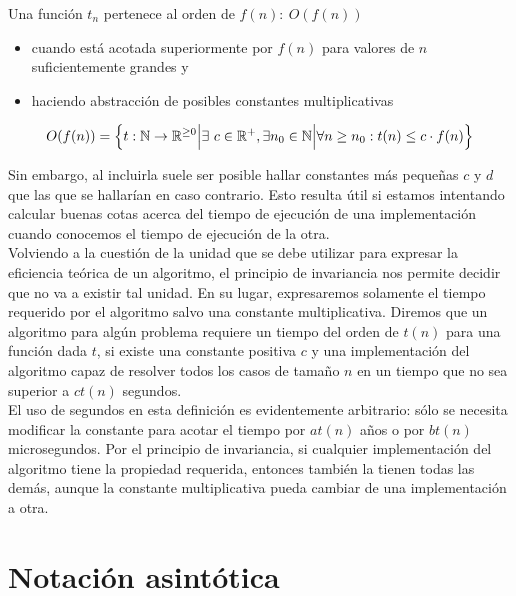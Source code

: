 \begin{fondo}
Una función $t_n$ pertenece al orden de $f(n):\ O(f(n))$
\begin{itemize}
\item cuando está acotada superiormente por $f(n)$ para valores de $n$ suficientemente grandes y
\item haciendo abstracción de posibles constantes multiplicativas
\end{itemize}
\begin{center}
\[O(f(n)) = \Bigl\{ t: \mathbb{N} \rightarrow \mathbb{R}^{\geq 0} \Bigl| \exists\ c \in \mathbb{R}^{+} , \exists n_{0} \in \mathbb{N} \Bigl| \forall n \geq n_{0} : t(n) \leq c \cdot f(n) \Bigl\} \]
\end{center}

\end{fondo}

Sin embargo, al incluirla suele ser posible hallar constantes más pequeñas $c$ y $d$ que las que se hallarían en caso contrario. Esto resulta útil si estamos intentando calcular buenas cotas acerca del tiempo de ejecución de una implementación cuando conocemos el tiempo de ejecución de la otra.\\

Volviendo a la cuestión de la unidad que se debe utilizar para expresar la eficiencia teórica de un algoritmo, el principio de invariancia nos permite decidir que no va a existir tal unidad. En su lugar, expresaremos solamente el tiempo requerido por el algoritmo salvo una constante multiplicativa. Diremos que un algoritmo para algún problema requiere un tiempo del orden de $t(n)$ para una función dada $t$, si existe una constante positiva $c$ y una implementación del algoritmo capaz de resolver todos los casos de tamaño $n$ en un tiempo que no sea superior a $ct(n)$ segundos. \\

El uso de segundos en esta definición es evidentemente arbitrario: sólo se necesita modificar la constante para acotar el tiempo por $at(n)$ años o por $bt(n)$ microsegundos. Por el principio de invariancia, si cualquier implementación del algoritmo tiene la propiedad requerida, entonces también la tienen todas las demás, aunque la constante multiplicativa pueda cambiar de una implementación a otra.\\

\section{Notación asintótica}

